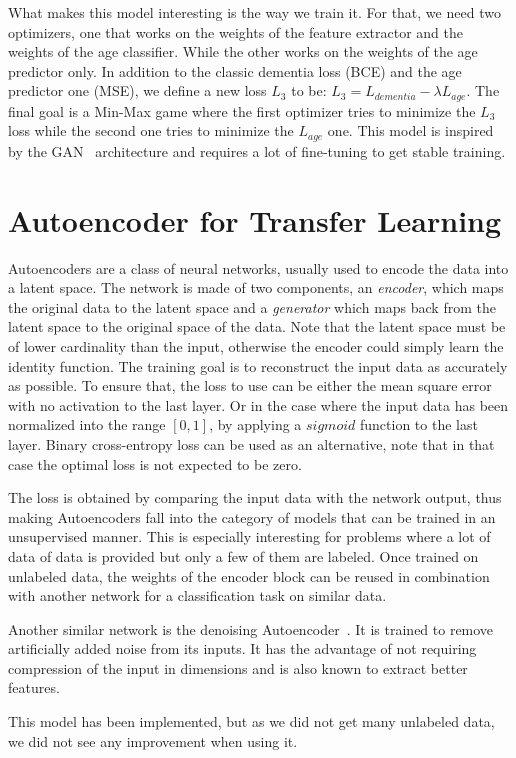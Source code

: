 What makes this model interesting is the way we train it. For that, we need two optimizers, one that works on the weights of the feature extractor and the weights of the age classifier. While the other works on the weights of the age predictor only. In addition to the classic dementia loss (BCE) and the age predictor one (MSE), we define a new loss $L_{3}$ to be: $L_3 = L_{dementia} - \lambda L_{age}$. The final goal is a Min-Max game where the first optimizer tries to minimize the $L_3$ loss while the second one tries to minimize the $L_{age}$ one. This model is inspired by the GAN~\cite{goodfellow2014generative} architecture and requires a lot of fine-tuning to get stable training.


\section{Autoencoder for Transfer Learning}
Autoencoders are a class of neural networks, usually used to encode the data into a latent space. The network is made of two components, an \textit{encoder}, which maps the original data to the latent space and a \textit{generator} which maps back from the latent space to the original space of the data. Note that the latent space must be of lower cardinality than the input, otherwise the encoder could simply learn the identity function. The training goal is to reconstruct the input data as accurately as possible. To ensure that, the loss to use can be either the mean square error with no activation to the last layer. Or in the case where the input data has been normalized into the range $[0, 1]$, by applying a $sigmoid$ function to the last layer. Binary cross-entropy loss can be used as an alternative, note that in that case the optimal loss is not expected to be zero.

The loss is obtained by comparing the input data with the network output, thus making Autoencoders fall into the category of models that can be trained in an unsupervised manner. This is especially interesting for problems where a lot of data of data is provided but only a few of them are labeled. Once trained on unlabeled data, the weights of the encoder block can be reused in combination with another network for a classification task on similar data.

Another similar network is the denoising Autoencoder~\cite{denoising_autoencoder_10.5555/1756006.1953039}. It is trained to remove artificially added noise from its inputs. It has the advantage of not requiring compression of the input in dimensions and is also known to extract better features.

This model has been implemented, but as we did not get many unlabeled data, we did not see any improvement when using it.
